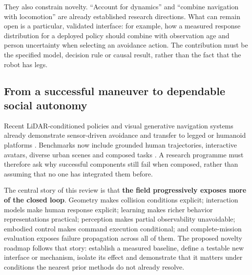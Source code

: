 They also constrain novelty. ``Account for dynamics'' and ``combine navigation
with locomotion'' are already established research directions. What can remain
open is a particular, validated interface: for example, how a measured response
distribution for a deployed policy should combine with observation age and
person uncertainty when selecting an avoidance action. The contribution must
be the specified model, decision rule or causal result, rather than the fact that
the robot has legs.

\subsection{From a successful maneuver to dependable social autonomy}
Recent LiDAR-conditioned policies and visual generative navigation systems
already demonstrate sensor-driven avoidance and transfer to legged or humanoid
platforms \citep{safehumanoid,omni,flux}. Benchmarks now include grounded human
trajectories, interactive avatars, diverse urban scenes and composed tasks
\citep{socnavbench,habitat3,metaurban,omninav,dped}. A research programme must
therefore ask why successful components still fail when composed, rather than
assuming that no one has integrated them before.

The central story of this review is that \textbf{the field progressively exposes
more of the closed loop}. Geometry makes collision conditions explicit;
interaction models make human response explicit; learning makes richer behavior
representations practical; perception makes partial observability unavoidable;
embodied control makes command execution conditional; and complete-mission
evaluation exposes failure propagation across all of them. The proposed novelty
roadmap follows that story: establish a measured baseline, define a testable new
interface or mechanism, isolate its effect and demonstrate that it matters under
conditions the nearest prior methods do not already resolve.
